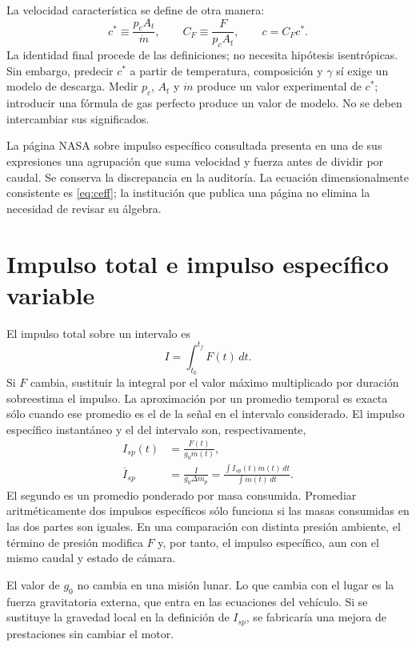 La velocidad característica se define de otra manera:
\begin{equation}
 c^*\equiv\frac{p_cA_t}{\dot m},\qquad C_F\equiv\frac{F}{p_cA_t},\qquad c=C_Fc^*.
\end{equation}
La identidad final procede de las definiciones; no necesita hipótesis isentrópicas. Sin embargo, predecir $c^*$ a partir de temperatura, composición y $\gamma$ sí exige un modelo de descarga. Medir $p_c$, $A_t$ y $\dot m$ produce un valor experimental de $c^*$; introducir una fórmula de gas perfecto produce un valor de modelo. No se deben intercambiar sus significados.

La página NASA sobre impulso específico consultada presenta en una de sus expresiones una agrupación que suma velocidad y fuerza antes de dividir por caudal. Se conserva la discrepancia en la auditoría. La ecuación dimensionalmente consistente es \eqref{eq:ceff}; la institución que publica una página no elimina la necesidad de revisar su álgebra.\cite{NASA-ISP}
\section{Impulso total e impulso específico variable}
El impulso total sobre un intervalo es
\begin{equation}
 I=\int_{t_0}^{t_f}F(t)\,dt.
\end{equation}
Si $F$ cambia, sustituir la integral por el valor máximo multiplicado por duración sobreestima el impulso. La aproximación por un promedio temporal es exacta sólo cuando ese promedio es el de la señal en el intervalo considerado. El impulso específico instantáneo y el del intervalo son, respectivamente,
\begin{align}
 I_{sp}(t)&=\frac{F(t)}{g_0\dot m(t)},\\
 \overline I_{sp}&=\frac{I}{g_0\Delta m_p}
 =\frac{\int I_{sp}(t)\dot m(t)\,dt}{\int\dot m(t)\,dt}.
\end{align}
El segundo es un promedio ponderado por masa consumida. Promediar aritméticamente dos impulsos específicos sólo funciona si las masas consumidas en las dos partes son iguales. En una comparación con distinta presión ambiente, el término de presión modifica $F$ y, por tanto, el impulso específico, aun con el mismo caudal y estado de cámara.

El valor de $g_0$ no cambia en una misión lunar. Lo que cambia con el lugar es la fuerza gravitatoria externa, que entra en las ecuaciones del vehículo. Si se sustituye la gravedad local en la definición de $I_{sp}$, se fabricaría una mejora de prestaciones sin cambiar el motor.
